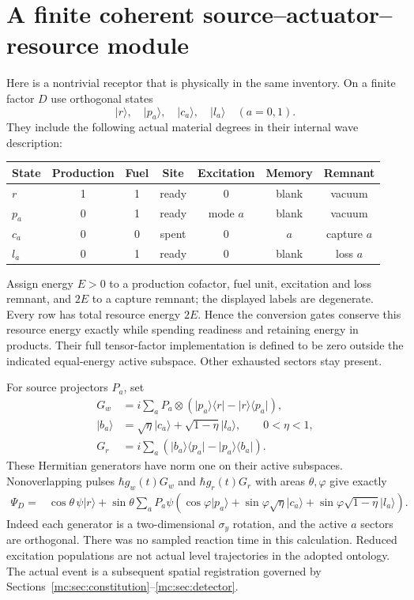 \documentclass[11pt,oneside,openany]{book}
\theoremstyle{definition}
\theoremstyle{remark}\newtheorem{remark}[theorem]{Remark}
\providecommand{\ket}[1]{\lvert#1\rangle}
\providecommand{\bra}[1]{\langle#1\rvert}
\begin{document}
\section{A finite coherent source--actuator--resource module}
\label{mc:sec:resource}
Here is a nontrivial receptor that is physically in the same inventory. On a finite factor $D$ use orthogonal states
\[
 \ket r,\quad\ket{p_a},\quad\ket{c_a},\quad\ket{l_a}\quad(a=0,1).
\]
They include the following actual material degrees in their internal wave description:
\begin{center}\small
\begin{tabular}{@{}lcccccc@{}}\toprule
State & Production & Fuel & Site & Excitation & Memory & Remnant\\\midrule
$r$ & 1 & 1 & ready & 0 & blank & vacuum\\
$p_a$ & 0 & 1 & ready & mode $a$ & blank & vacuum\\
$c_a$ & 0 & 0 & spent & 0 & $a$ & capture $a$\\
$l_a$ & 0 & 1 & ready & 0 & blank & loss $a$\\\bottomrule
\end{tabular}
\end{center}
Assign energy $E>0$ to a production cofactor, fuel unit, excitation and loss remnant, and $2E$ to a capture remnant; the displayed labels are degenerate. Every row has total resource energy $2E$. Hence the conversion gates conserve this resource energy exactly while spending readiness and retaining energy in products. Their full tensor-factor implementation is defined to be zero outside the indicated equal-energy active subspace. Other exhausted sectors stay present.

For source projectors $P_a$, set
\begin{align}\label{mc:eq:reactionG}
 G_w&=i\sum_aP_a\otimes(\ket{p_a}\bra r-\ket r\bra{p_a}),\\
 \ket{b_a}&=\sqrt\eta\ket{c_a}+\sqrt{1-\eta}\ket{l_a},\qquad 0<\eta<1,\nonumber\\
 G_r&=i\sum_a(\ket{b_a}\bra{p_a}-\ket{p_a}\bra{b_a}).\nonumber
\end{align}
These Hermitian generators have norm one on their active subspaces. Nonoverlapping pulses $\hbar g_w(t)G_w$ and $\hbar g_r(t)G_r$ with areas $\theta,\varphi$ give exactly
\begin{equation}\label{mc:eq:resourcewave}
 \begin{split}
 \Psi_D={}&\cos\theta\,\psi\ket r+\sin\theta\sum_aP_a\psi
 \left(\cos\varphi\ket{p_a}+\sin\varphi\sqrt\eta\ket{c_a}
                    +\sin\varphi\sqrt{1-\eta}\ket{l_a}\right).
 \end{split}
\end{equation}
Indeed each generator is a two-dimensional $\sigma_y$ rotation, and the active $a$ sectors are orthogonal. There was no sampled reaction time in this calculation. Reduced excitation populations are not actual level trajectories in the adopted ontology. The actual event is a subsequent spatial registration governed by Sections~\ref{mc:sec:constitution}--\ref{mc:sec:detector}.
\end{document}
